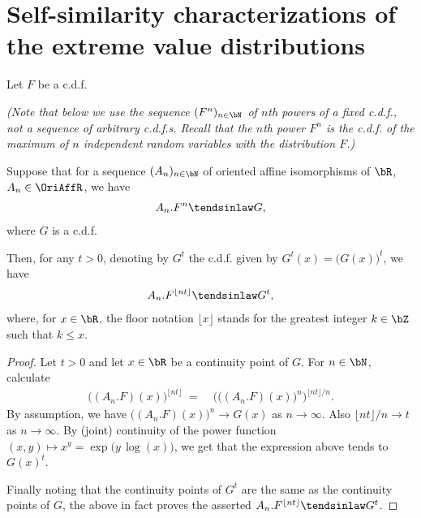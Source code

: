 \section{Self-similarity characterizations of the extreme value distributions}

\begin{lemma}
  \label{lem:continuous-parameter-ev-limit}
  \leanok
  Let $F$ be a c.d.f.

  \emph{(Note that below we use
  the sequence $(F^n)_{n \in \bN}$ of $n$th powers of a fixed c.d.f.,
  not a sequence of arbitrary c.d.f.s.
  Recall that the $n$th power $F^n$ is the c.d.f. of the maximum
  of $n$ independent random variables with the distribution $F$.)}

  Suppose that for a sequence $(A_n)_{n \in \bN}$ of oriented
  affine isomorphisms of $\bR$, $A_n \in \OriAffR$, we have
  \begin{align*}
    A_n.F^n \tendsinlaw G ,
  \end{align*}
  where $G$ is a c.d.f.

  Then, for any $t > 0$, denoting by $G^t$ the c.d.f. given by
  $G^t(x) = \big( G(x) \big)^t$, we have
  \begin{align*}
    A_{n}.F^{\lfloor n t \rfloor} \tendsinlaw G^t ,
  \end{align*}
  where, for $x \in \bR$, the floor notation $\lfloor x \rfloor$ stands
  for the greatest integer $k \in \bZ$ such that $k \le x$.
\end{lemma}
\begin{proof}
  Let $t > 0$ and let $x \in \bR$ be a continuity point of $G$.
  For $n \in \bN$, calculate
  \begin{align*}
      \big((A_n . F) (x) \big)^{\lfloor n t \rfloor}
    \; = \; & \Big( \big((A_n . F) (x) \big)^n \Big)^{\lfloor n t \rfloor / n} .
  \end{align*}
  By assumption, we have $\big((A_n . F) (x) \big)^n \to G(x)$ as $n \to \infty$.
  Also $\lfloor n t \rfloor / n \to t$ as $n \to \infty$.
  By (joint) continuity of the power function
  $(x,y) \mapsto x^y = \exp\big( y \, \log(x) \big)$,
  we get that the expression above tends to $G(x)^t$.

  Finally noting that the continuity points of $G^t$ are the same as the
  continuity points of $G$, the above in fact proves the asserted
  $A_{n}.F^{\lfloor n t \rfloor} \tendsinlaw G^t$.
\end{proof}

